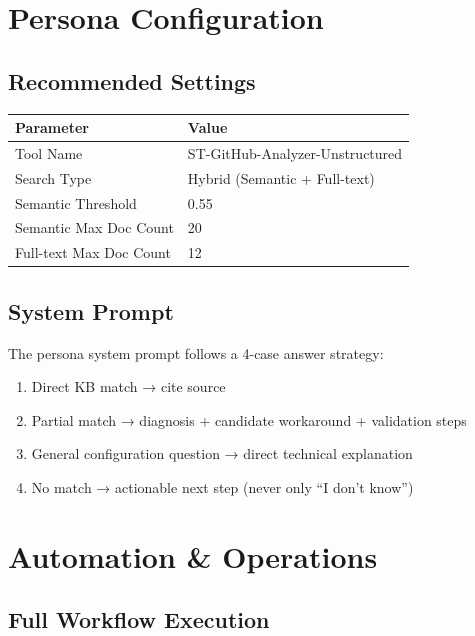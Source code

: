 \documentclass[12pt,a4paper]{report}
\begin{document}
\chapter{Persona Configuration}

\section{Recommended Settings}

\begin{longtable}{p{5cm}p{8cm}}
\toprule
\textbf{Parameter} & \textbf{Value} \\
\midrule
Tool Name & ST-GitHub-Analyzer-Unstructured \\
Search Type & Hybrid (Semantic + Full-text) \\
Semantic Threshold & 0.55 \\
Semantic Max Doc Count & 20 \\
Full-text Max Doc Count & 12 \\
\bottomrule
\end{longtable}

\section{System Prompt}

The persona system prompt follows a 4-case answer strategy:
\begin{enumerate}
  \item Direct KB match → cite source
  \item Partial match → diagnosis + candidate workaround + validation steps
  \item General configuration question → direct technical explanation
  \item No match → actionable next step (never only ``I don't know'')
\end{enumerate}

\chapter{Automation \& Operations}

\section{Full Workflow Execution}
\end{document}
